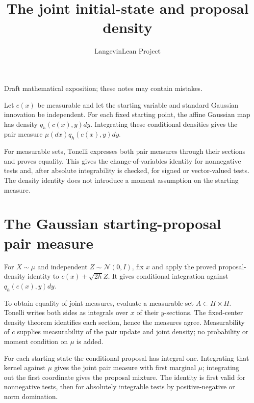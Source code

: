 \documentclass[11pt,a4paper]{article}
\title{\texorpdfstring{The joint initial-state and proposal density}{The joint initial-state and proposal density}}
\author{LangevinLean Project}
\date{}
\begin{document}
\maketitle
Draft mathematical exposition; these notes may contain mistakes.


Let \(c(x)\) be measurable and let the starting variable and standard Gaussian innovation be independent. For each fixed starting point, the affine Gaussian map has density \(q_h(c(x),y)dy\). Integrating these conditional densities gives the pair measure \(\mu(dx)q_h(c(x),y)dy\).



For measurable sets, Tonelli expresses both pair measures through their sections and proves equality. This gives the change-of-variables identity for nonnegative tests and, after absolute integrability is checked, for signed or vector-valued tests. The density identity does not introduce a moment assumption on the starting measure.


\section{\texorpdfstring{The Gaussian starting-proposal pair measure}{The Gaussian starting-proposal pair measure}}


For \(X\sim\mu\) and independent \(Z\sim\mathcal N(0,I)\), fix \(x\) and apply the proved proposal-density identity to \(c(x)+\sqrt{2h}Z\). It gives conditional integration against \(q_h(c(x),y)dy\).



To obtain equality of joint measures, evaluate a measurable set \(A\subset H\times H\). Tonelli writes both sides as integrals over \(x\) of their \(y\)-sections. The fixed-center density theorem identifies each section, hence the measures agree. Measurability of \(c\) supplies measurability of the pair update and joint density; no probability or moment condition on \(\mu\) is added.



For each starting state the conditional proposal has integral one. Integrating that kernel against \(\mu\) gives the joint pair measure with first marginal \(\mu\); integrating out the first coordinate gives the proposal mixture. The identity is first valid for nonnegative tests, then for absolutely integrable tests by positive-negative or norm domination.
\end{document}
